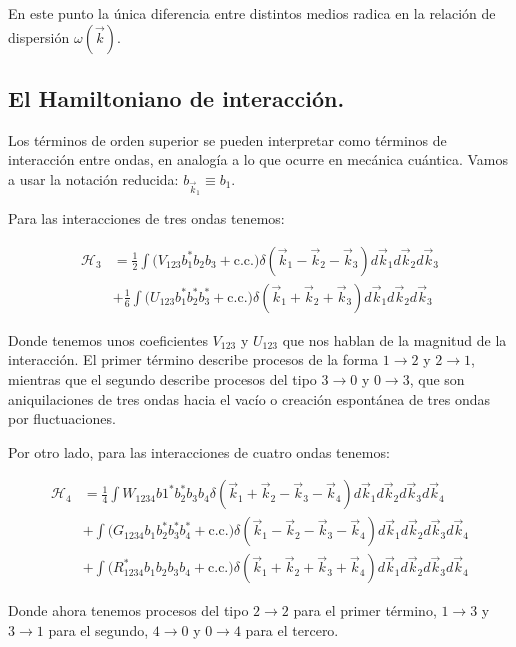 En este punto la única diferencia entre distintos medios radica en la relación de dispersión $\omega(\vec k)$.

\subsection*{El Hamiltoniano de interacción.}
Los términos de orden superior se pueden interpretar como términos de interacción entre ondas, en analogía a lo que ocurre en mecánica cuántica. Vamos a usar la notación reducida: $b_{\vec k_1} \equiv b_1$.

Para las interacciones de tres ondas tenemos:

\begin{equation}
	\begin{split}
		\mathcal{H}_3 &= \frac{1}{2}\int\big(V_{123}b^*_1b_2b_3+\text{c.c.}\big)\delta(\vec k_1-\vec k_2 -\vec k_3) d\vec k_1d\vec k_2d\vec k_3 \\ &+ \frac{1}{6} \int\big(U_{123}b^*_1b^*_2b^*_3+\text{c.c.}\big)\delta(\vec k_1 + \vec k_2 + \vec k_3) d\vec k_1d\vec k_2d\vec k_3
	\end{split}
\end{equation} 

Donde tenemos unos coeficientes $V_{123}$ y $U_{123}$ que nos hablan de la magnitud de la interacción. El primer término describe procesos de la forma $1\rightarrow2$ y  $2\rightarrow1$, mientras que el segundo describe procesos del tipo $3\rightarrow0$ y $0\rightarrow3$, que son aniquilaciones de tres ondas hacia el vacío o creación espontánea de tres ondas por fluctuaciones. %

Por otro lado, para las interacciones de cuatro ondas tenemos:

\begin{equation}
	\begin{split}
		\mathcal{H}_4 &= \frac{1}{4} \int W_{1234}b1^*b_2^*b_3b_4\delta(\vec k_1+\vec k_2-\vec k_3-\vec k_4) d\vec k_1d\vec k_2d\vec k_3d\vec k_4 \\
		&+\int \big(G_{1234}b_1b_2^*b_3^*b_4^* + \text{c.c.}\big) \delta(\vec k_1-\vec k_2-\vec k_3-\vec k_4) d\vec k_1d\vec k_2d\vec k_3d\vec k_4 \\
		&+\int \big(R^*_{1234}b_1b_2b_3b_4 + \text{c.c.}\big) \delta(\vec k_1+\vec k_2+\vec k_3+\vec k_4) d\vec k_1d\vec k_2d\vec k_3d\vec k_4
	\end{split}	
\end{equation}

Donde ahora tenemos procesos del tipo $2\rightarrow2$ para el primer término, $1\rightarrow3$ y $3\rightarrow1$ para el segundo, $4\rightarrow0$ y $0\rightarrow4$ para el tercero.
 
